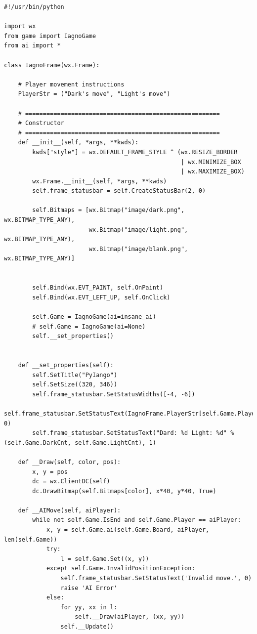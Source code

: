 \documentclass[oneside,a4paper]{article}
\begin{document}
\begin{lstlisting}[caption={frame.py}]
#!/usr/bin/python

import wx
from game import IagnoGame
from ai import *

class IagnoFrame(wx.Frame):

    # Player movement instructions
    PlayerStr = ("Dark's move", "Light's move")

    # =======================================================
    # Constructor
    # =======================================================
    def __init__(self, *args, **kwds):
        kwds["style"] = wx.DEFAULT_FRAME_STYLE ^ (wx.RESIZE_BORDER
                                                  | wx.MINIMIZE_BOX
                                                  | wx.MAXIMIZE_BOX)
        wx.Frame.__init__(self, *args, **kwds)
        self.frame_statusbar = self.CreateStatusBar(2, 0)

        self.Bitmaps = [wx.Bitmap("image/dark.png", wx.BITMAP_TYPE_ANY),
                        wx.Bitmap("image/light.png", wx.BITMAP_TYPE_ANY),
                        wx.Bitmap("image/blank.png", wx.BITMAP_TYPE_ANY)]

        
        self.Bind(wx.EVT_PAINT, self.OnPaint)
        self.Bind(wx.EVT_LEFT_UP, self.OnClick)
        
        self.Game = IagnoGame(ai=insane_ai)
        # self.Game = IagnoGame(ai=None)
        self.__set_properties()


    def __set_properties(self):
        self.SetTitle("PyIango")
        self.SetSize((320, 346))
        self.frame_statusbar.SetStatusWidths([-4, -6])
        self.frame_statusbar.SetStatusText(IagnoFrame.PlayerStr[self.Game.Player], 0)
        self.frame_statusbar.SetStatusText("Dard: %d Light: %d" % (self.Game.DarkCnt, self.Game.LightCnt), 1)

    def __Draw(self, color, pos):
        x, y = pos
        dc = wx.ClientDC(self)
        dc.DrawBitmap(self.Bitmaps[color], x*40, y*40, True)
        
    def __AIMove(self, aiPlayer):
        while not self.Game.IsEnd and self.Game.Player == aiPlayer:
            x, y = self.Game.ai(self.Game.Board, aiPlayer, len(self.Game))
            try:
                l = self.Game.Set((x, y))
            except self.Game.InvalidPositionException:
                self.frame_statusbar.SetStatusText('Invalid move.', 0)
                raise 'AI Error'
            else:
                for yy, xx in l:
                    self.__Draw(aiPlayer, (xx, yy))
                self.__Update()
                

\end{lstlisting}
\end{document}
